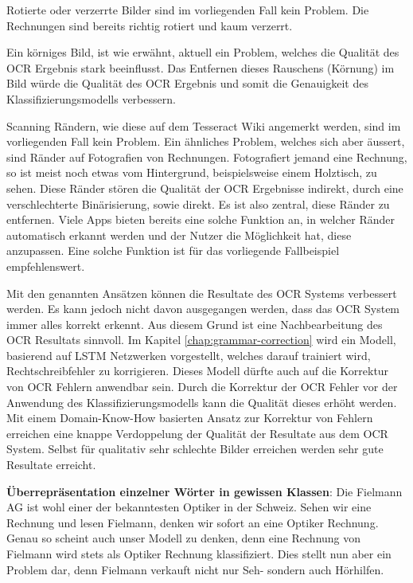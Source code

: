 Rotierte oder verzerrte Bilder sind im vorliegenden Fall kein Problem. Die Rechnungen sind bereits richtig rotiert und kaum verzerrt.

Ein körniges Bild, ist wie erwähnt, aktuell ein Problem, welches die Qualität des OCR Ergebnis stark beeinflusst. Das Entfernen dieses Rauschens (Körnung) im Bild würde die Qualität des OCR Ergebnis und somit die Genauigkeit des Klassifizierungsmodells verbessern.

Scanning Rändern, wie diese auf dem Tesseract Wiki angemerkt werden, sind im vorliegenden Fall kein Problem. Ein ähnliches Problem, welches sich aber äussert, sind Ränder auf Fotografien von Rechnungen. Fotografiert jemand eine Rechnung, so ist meist noch etwas vom Hintergrund, beispielsweise einem Holztisch, zu sehen. Diese Ränder stören die Qualität der OCR Ergebnisse indirekt, durch eine verschlechterte Binärisierung, sowie direkt. Es ist also zentral, diese Ränder zu entfernen. Viele Apps bieten bereits eine solche Funktion an, in welcher Ränder automatisch erkannt werden und der Nutzer die Möglichkeit hat, diese anzupassen. Eine solche Funktion ist für das vorliegende Fallbeispiel empfehlenswert.

Mit den genannten Ansätzen können die Resultate des OCR Systems verbessert werden. Es kann jedoch nicht davon ausgegangen werden, dass das OCR System immer alles korrekt erkennt. Aus diesem Grund ist eine Nachbearbeitung des OCR Resultats sinnvoll. Im Kapitel \ref{chap:grammar-correction} wird ein Modell, basierend auf LSTM Netzwerken vorgestellt, welches darauf trainiert wird, Rechtschreibfehler zu korrigieren. Dieses Modell dürfte auch auf die Korrektur von OCR Fehlern anwendbar sein. Durch die Korrektur der OCR Fehler vor der Anwendung des Klassifizierungsmodells kann die Qualität dieses erhöht werden. Mit einem Domain-Know-How basierten Ansatz zur Korrektur von Fehlern erreichen \textcite{OCRCorrection} eine knappe Verdoppelung der Qualität der Resultate aus dem OCR System. Selbst für qualitativ sehr schlechte Bilder erreichen werden sehr gute Resultate erreicht.


\textbf{Überrepräsentation einzelner Wörter in gewissen Klassen}: Die Fielmann AG ist wohl einer der bekanntesten Optiker in der Schweiz. Sehen wir eine Rechnung und lesen Fielmann, denken wir sofort an eine Optiker Rechnung. Genau so scheint auch unser Modell zu denken, denn eine Rechnung von Fielmann wird stets als Optiker Rechnung klassifiziert. Dies stellt nun aber ein Problem dar, denn Fielmann verkauft nicht nur Seh- sondern auch Hörhilfen.

